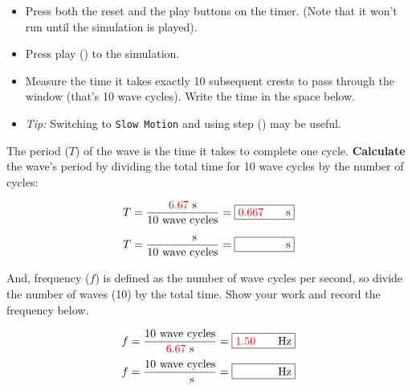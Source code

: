 \documentclass[]{exam}
\begin{document}
\begin{questions}
\begin{parts}
\clearpage

\begin{itemize}
    \item Press both the reset and the play buttons on the timer. (Note that it won't run until the simulation is played).
    \item Press play (\faPlay) to the simulation.
    \item Measure the time it takes exactly 10 subsequent crests to pass through the window (that's 10 wave cycles). Write the time in the space below.
    \item \textit{Tip:} Switching to \texttt{Slow Motion} and using step (\faStepForward) may be useful. 
\end{itemize}



\begin{center}
\end{center}

The period ($T$) of the wave is the time it takes to complete one cycle. \textbf{Calculate} the wave's period by dividing the total time for 10 wave cycles by the number of cycles:


\ifprintanswers
\begin{equation*}
    T = \frac{\textcolor{red}{6.67}\ \mathrm{s}}{\text{10 wave cycles}} = \boxed{\textcolor{red}{0.667} \qquad \mathrm{s}}
\end{equation*}
\else
\begin{equation*}
    T = \frac{\textcolor{white}{6.67}\ \mathrm{s}}{\text{10 wave cycles}} = \boxed{\textcolor{white}{0.667}\qquad \mathrm{s}}
\end{equation*}
\fi


And, frequency ($f$) is defined as the number of wave cycles per second, so divide the number of waves (10) by the total time. Show your work and record the frequency below.

\ifprintanswers
\begin{equation*}
    f = \frac{\text{10 wave cycles}}{\textcolor{red}{6.67}\ \mathrm{s}} = \boxed{\textcolor{red}{1.50}\qquad \mathrm{Hz}}
\end{equation*}
\else
\begin{equation*}
    f = \frac{\text{10 wave cycles}}{\textcolor{white}{6.67}\ \mathrm{s}} = \boxed{\textcolor{white}{1.50}\qquad \mathrm{Hz}}
\end{equation*}
\fi


\end{parts}
\end{questions}
\end{document}
